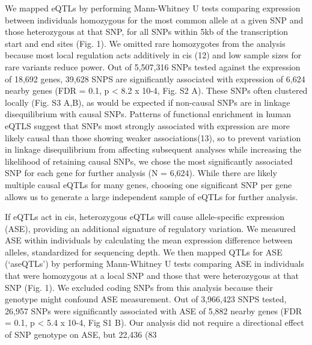 We mapped eQTLs by performing Mann-Whitney U tests comparing expression between individuals homozygous for the most common allele at a given SNP and those heterozygous at that SNP, for all SNPs within 5kb of the transcription start and end sites (Fig. 1). We omitted rare homozygotes from the analysis because most local regulation acts additively in cis (12) and low sample sizes for rare variants reduce power. Out of 5,507,316 SNPs tested against the expression of 18,692 genes, 39,628 SNPS are significantly associated with expression of 6,624 nearby genes (FDR = 0.1, p < 8.2 x 10-4, Fig. S2 A). These SNPs often clustered locally (Fig. S3 A,B), as would be expected if non-causal SNPs are in linkage disequilibrium with causal SNPs. Patterns of functional enrichment in human eQTLS suggest that SNPs most strongly associated with expression are more likely causal than those showing weaker associations(13), so to prevent variation in linkage disequilibrium from affecting subsequent analyses while increasing the likelihood of retaining causal SNPs, we chose the most significantly associated SNP for each gene for further analysis (N = 6,624). While there are likely multiple causal eQTLs for many genes, choosing one significant SNP per gene allows us to generate a large independent sample of eQTLs for further analysis.

If eQTLs act in cis, heterozygous eQTLs will cause allele-specific expression (ASE), providing an additional signature of regulatory variation. We measured ASE within individuals by calculating the mean expression difference between alleles, standardized for sequencing depth. We then mapped QTLs for ASE (‘aseQTLs’) by performing Mann-Whitney U tests comparing ASE in individuals that were homozygous at a local SNP and those that were heterozygous at that SNP (Fig. 1). We excluded coding SNPs from this analysis because their genotype might confound ASE measurement. Out of 3,966,423 SNPS tested, 26,957 SNPs were significantly associated with ASE of 5,882 nearby genes (FDR = 0.1, p < 5.4 x 10-4, Fig S1 B). Our analysis did not require a directional effect of SNP genotype on ASE, but 22,436 (83%

